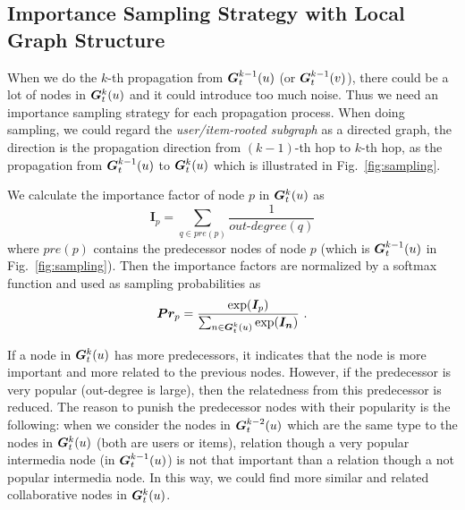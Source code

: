 
\subsection{Importance Sampling Strategy with Local Graph Structure}\label{sec:sampling}
When we do the $k$-th propagation from $\bm{G}_t^{k-1}(u)$ (or $\bm{G}_t^{k-1}(v)$), there could be a lot of nodes in $\bm{G}_t^k(u)$ and it could introduce too much noise. Thus we need an importance sampling strategy for each propagation process.
When doing sampling, we could regard the \textit{user/item-rooted subgraph} as a directed graph, the direction is the propagation direction from $(k-1)$-th hop to $k$-th hop, as the propagation from $\bm{G}^{k-1}_t(u)$ to $\bm{G}^k_t(u)$ which is illustrated in Fig.~\ref{fig:sampling}.

We calculate the importance factor of node $p$ in $\bm{G}^k_t(u)$ as
\begin{equation}
	\bm{I}_p = \sum_{q \in pre(p)} \frac{1}{\textit{out-degree}(q)}
\end{equation}
where $pre(p)$ contains the predecessor nodes of node $p$ (which is $\bm{G}^{k-1}_t(u)$ in Fig.~\ref{fig:sampling}).
Then the importance factors are normalized by a softmax function and used as sampling probabilities as 
\begin{equation}
	\bm{Pr}_p = \frac{\exp(\bm{I}_p)}{\sum_{n\in \bm{G}^{k}_t(u)} \exp(\bm{I_n})} ~.
\end{equation}

If a node in $\bm{G}^k_t(u)$ has more predecessors, it indicates that the node is more important and more related to the previous nodes. However, if the predecessor is very popular (out-degree is large), then the relatedness from this predecessor is reduced. 
The reason to punish the predecessor nodes with their popularity is the following: when we consider the nodes in $\bm{G}^{k-2}_t(u)$ which are the same type to the nodes in $\bm{G}^k_t(u)$ (both are users or items), relation though a very popular intermedia node (in $\bm{G}^{k-1}_t
(u)$) is not that important than a relation though a not popular intermedia node. In this way, we could find more similar and related collaborative nodes in $\bm{G}^{k}_t(u)$.


